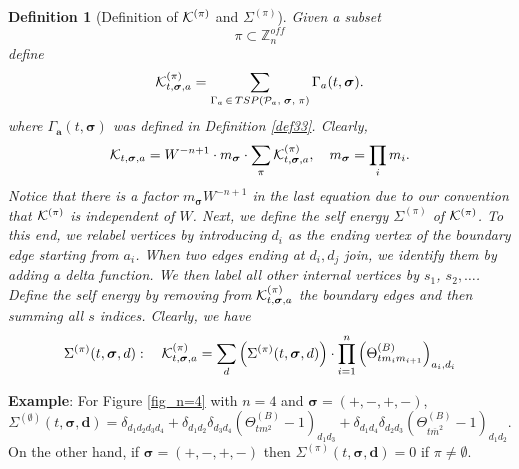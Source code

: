 \documentclass[10pt,reqno]{article}
\renewcommand{\bar}{\overline}
\theoremstyle{plain} %
\newtheorem{definition}[theorem]{Definition}
\theoremstyle{remark}
\numberwithin{equation}{section}
\begin{document}
\begin{definition}[Definition of $\cal K^{(\pi)}$ and $\Sigma^{(\pi)}$]\label{def_Kpi}
Given a subset 
 \begin{equation}\label{defpiij}
  \pi \subset \mathbb Z_n^{off} 
 \end{equation}
 define 
 \begin{equation} 
     {\cal K}^{(\pi)}_{t, \boldsymbol{\sigma}, \textbf{a}} = \sum_{\Gamma_{\textbf{a}}\, \in\,  {TSP}({\cal P}_{\textbf{a}},\; \boldsymbol{\sigma},\; \pi )} \Gamma_{ \textbf{a}}(t, \boldsymbol{\sigma}).
   \end{equation} 
   where $\Gamma_{ \textbf{a}}(t, \boldsymbol{\sigma})$ was defined in Definition \ref{def33}.
Clearly, 
\begin{equation}\label{KKpi}
  {\cal K}_{t, \boldsymbol{\sigma}, \textbf{a}} =W^{-n+1}\cdot m_{\boldsymbol{\sigma}}\cdot \sum_{\pi}{\cal K}_{t, \boldsymbol{\sigma}, \textbf{a}} ^{(\pi)},\quad m_{\boldsymbol{\sigma}}=\prod_i m_i. 
\end{equation}
Notice that there is a factor $m_{\boldsymbol{\sigma}}W^{-n+1}$ in the last equation due to our convention that $\cal K^{(\pi)}$ is independent of $W$. 
 Next, we define the self energy $\Sigma^{(\pi)}$  of ${\cal K}^{(\pi)}$.   To this end, we relabel vertices by  introducing 
  $d_i$ as the ending vertex of the boundary edge starting from  $a_i$.  When two edges ending at $d_i, d_j$ join, we identify them by adding a delta function.  We then label all other internal vertices by $s_1$, $s_2, \ldots$.  
   Define the self energy by removing from $ {\cal K}^{(\pi)}_{t, \boldsymbol{\sigma}, \textbf{a}}$ the boundary edges and then summing all $s$ indices.  
Clearly, we have 
\begin{equation} 
\Sigma^{(\pi)}(t, \boldsymbol{\sigma}, \textbf{d}): 
\quad  
{\cal K}^{(\pi)}_{t, \boldsymbol{\sigma}, \textbf{a}}
=
\sum_{\textbf{d}}\left(\Sigma^{(\pi)}(t, \boldsymbol{\sigma}, \textbf{d})\right)
\cdot 
\prod_{i=1}^n \left(\Theta^{(B)}_{tm_im_{i+1}}\right)_{a_i, d_i}   
\end{equation} 
\end{definition}
 

\noindent 
{\bf Example}: For Figure \ref{fig_n=4} with $n=4$ and 
$\boldsymbol{\sigma}=(+,-,+,-) $, 
$$
\Sigma^{(\emptyset)}(t, \boldsymbol{\sigma}, \textbf{d}) = \delta_{d_1 d_2 d_3 d_4}
+ \delta_{d_1 d_2} \delta_{d_3 d_4} \left(\Theta^{(B)}_{t m^2} - 1\right)_{d_1 d_3}
+ \delta_{d_1 d_4} \delta_{d_2 d_3} \left(\Theta^{(B)}_{t \bar m^2} - 1\right)_{d_1 d_2}.
$$
On the other hand, if  $\boldsymbol{\sigma}=(+,-,+,-)$  then 
$\Sigma^{(\pi)}(t, \boldsymbol{\sigma}, \textbf{d})=0$ if $\pi\ne \emptyset$.
\end{document}
